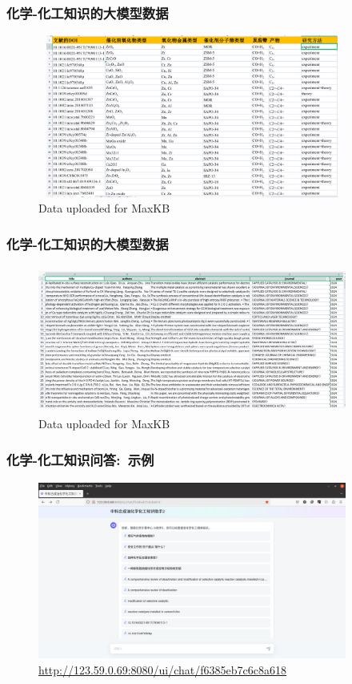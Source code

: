 \begin{frame}
	\frametitle{化学-化工知识的大模型数据}	
\begin{figure}[h!]
\centering
\includegraphics[height=2.10in,width=4.00in,viewport=0 0 1149 636,clip]{Figures/MaxKB_Info-1.png}
\caption{\tiny\textrm{Data uploaded for MaxKB}}%
\label{Fig:MaxKB_Data-1}
\end{figure}
\end{frame}

\begin{frame}
	\frametitle{化学-化工知识的大模型数据}	
\begin{figure}[h!]
\centering
\includegraphics[height=1.90in,width=4.00in,viewport=0 0 1456 647,clip]{Figures/MaxKB_Info-2.png}
\caption{\tiny\textrm{Data uploaded for MaxKB}}%
\label{Fig:MaxKB_Data-2}
\end{figure}
\end{frame}

\begin{frame}
	\frametitle{化学-化工知识问答:~示例}	
\begin{figure}[h!]
\centering
\includegraphics[height=2.30in,width=4.00in,viewport=0 0 1528 875,clip]{Figures/MaxKB_Chem.png}
\caption{\tiny\textrm{\url{http://123.59.0.69:8080/ui/chat/f6385eb7c6c8a618}}}%
\label{Fig:MaxKB_Chem}
\end{figure}
\end{frame}

